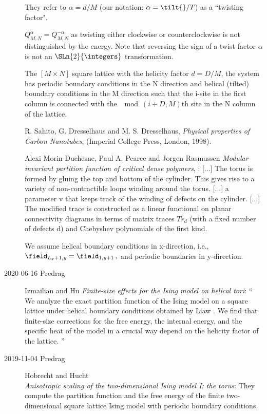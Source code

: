 \begin{description}
They refer to  $\alpha=d/M$  (our notation: $\alpha=\tilt{}/\period{}$)
as a ``twisting factor".

$Q_{M,N}^{\alpha}=Q_{M,N}^{-\alpha }$ as twisting either clockwise or
counterclockwise is not distinguished by the energy. Note that reversing
the sign of a twist factor $\alpha$ is not an $\SLn{2}{\integers}$ transformation.

The $[M\times N]$ square lattice with the helicity factor
$d=D/M$, the system has
periodic boundary conditions in the N direction and
helical (tilted) boundary conditions in the M direction such
that the i-site in the first column is connected with the
$\mod(i+D, M)$th site in the N column of the lattice.

R. Sahito, G. Dresselhaus and M. S. Dresselhaus, \emph{Physical
properties of Carbon Nanotubes}, (Imperial College Press, London, 1998).



Alexi Morin-Duchesne, Paul A. Pearce and Jorgen Rasmussen
{\em Modular invariant partition function of critical dense polymers},
:
{[...]} The torus is formed by gluing the top and bottom of the cylinder.
This gives rise to a variety of non-contractible loops winding around the
torus. [...] a parameter v that keeps track of the winding of defects on
the cylinder. [...] The modified trace is constructed as a linear
functional on planar connectivity diagrams in terms of matrix traces
$Tr_d$ (with a fixed number of defects d) and Chebyshev polynomials of
the first kind.

We assume helical boundary conditions in x-direction, i.e.,
\(
\field_{L_x+1,y}=\field_{1,y+1}
\,,
\)
and periodic boundaries in y-direction.

\item[2020-06-16 Predrag]
Izmailian and Hu
{\em Finite-size effects for the {Ising} model on helical tori}:
``
We analyze the exact partition function of the Ising model on a square
lattice under helical boundary conditions obtained by Liaw
\etal{}. We find that finite-size corrections for the free
energy, the internal energy, and the specific heat of the model in a
crucial way depend on the helicity factor of the lattice.
''


\item[2019-11-04 Predrag]
\newcommand{\Pf}{\mbox{\rm Pf}\,}
Hobrecht and Hucht\\
{\em Anisotropic scaling of the two-dimensional {Ising} model {I:} the torus}:
They compute the partition function and the free energy of the finite
two-dimensional square lattice Ising model with periodic boundary
conditions.


\end{description}
